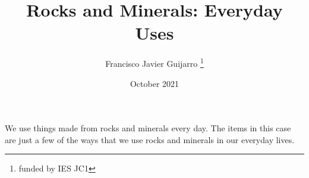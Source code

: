 \documentclass[12pt, letterpaper, twoside]{article}
\title{Rocks and Minerals: Everyday Uses}
\author{Francisco Javier Guijarro \thanks{funded by IES JC1}}
\date{October 2021}
\begin{document}
\maketitle
We use things made from rocks and minerals every day. The items in this case are just a few of the ways that we use rocks and minerals in our everyday lives.
\end{document}

